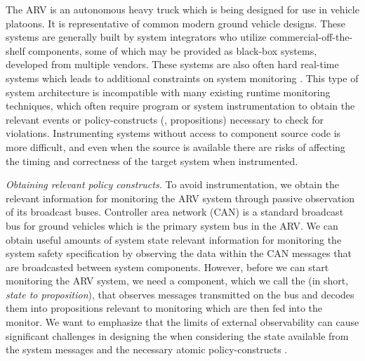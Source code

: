 The ARV is an autonomous heavy truck which is being designed for use in vehicle platoons. It is representative of common modern ground vehicle designs.
These systems are generally built by system integrators who utilize commercial-off-the-shelf  components, some of which may be provided as black-box systems,
developed from multiple vendors.
These systems are also often hard real-time systems which leads to additional constraints on system monitoring \cite{Goodloe2010}.
This type of system architecture is incompatible with many existing runtime monitoring techniques, which often require program or system instrumentation \cite{Havelund2004, Chen2003, Bonakdarpour2012,Kim2004} to obtain the relevant events or policy-constructs (\eg, propositions) necessary to check for violations.
Instrumenting systems without access to component source code is more difficult, and even when the source is available there are risks of affecting the timing and correctness of the target system when instrumented.

\noindent
\textit{Obtaining relevant policy constructs.}
To avoid instrumentation, we obtain the relevant information for monitoring the ARV system through passive observation of
its broadcast buses. %
Controller area network (CAN) is a
standard broadcast bus for ground vehicles which is the primary system bus in the ARV. We can obtain useful amounts of system state relevant information for monitoring
the system safety specification by observing the data within the CAN messages that are broadcasted between system components.
However, before we can start monitoring the ARV system, we need a component, which we call the \sfmap (in short, \emph{state to proposition}), that observes messages transmitted on the bus and decodes
them into propositions relevant to monitoring which are then fed into the monitor.
We want to emphasize that the limits of external observability can cause significant challenges
in designing the \sfmap when considering the state available from the system messages and
the necessary atomic policy-constructs \cite{Kane2014}.

